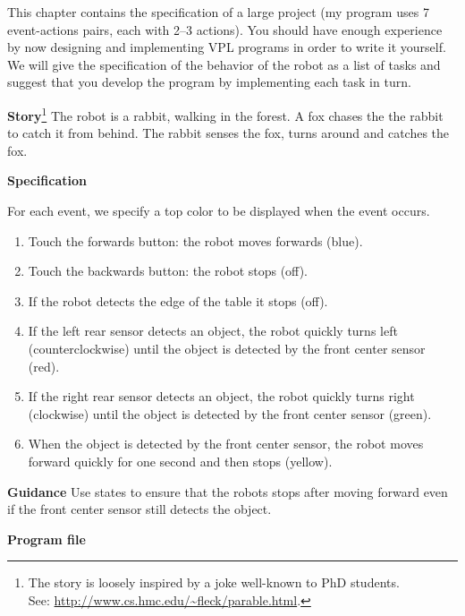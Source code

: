 
\label{ch.rabbit}

This chapter contains the specification of a large project (my program
uses 7 event-actions pairs, each with 2--3 actions). You should have
enough experience by now designing and implementing VPL programs in
order to write it yourself. We will give the specification of the
behavior of the robot as a list of tasks and suggest that you develop
the program by implementing each task in turn.


\textbf{Story}\footnote{The story is loosely inspired by a joke
well-known to PhD students.\\ See:
\url{http://www.cs.hmc.edu/~fleck/parable.html}.} The robot is a rabbit,
walking in the forest. A fox chases the the rabbit to catch
it from behind. The rabbit senses the fox, turns around and catches the
fox.


\textbf{Specification}

For each event, we specify a top color to be displayed when the event occurs.

\begin{enumerate}
\item Touch the forwards button: the robot moves forwards (blue).
\item Touch the backwards button: the robot stops (off).
\item If the robot detects the edge of the table it stops (off).
\item If the left rear sensor detects an object, the robot quickly turns
left (counterclockwise) until the object is detected by the front center
sensor (red).
\item If the right rear sensor detects an object, the robot quickly turns
right (clockwise) until the object is detected by the front center
sensor (green).
\item When the object is detected by the front center sensor, the robot
moves forward quickly for one second and then stops (yellow).
\end{enumerate}

\textbf{Guidance} Use states to ensure that the robots stops after
moving forward even if the front center sensor still detects the object.

\bigskip

{\raggedleft \hfill \textbf{Program file} }
